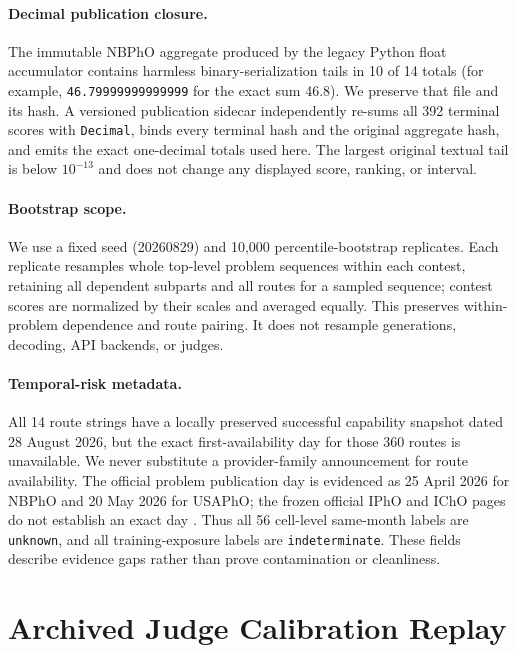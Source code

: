 \documentclass[11pt]{article}
\begin{document}
\paragraph{Decimal publication closure.}
The immutable NBPhO aggregate produced by the legacy Python float accumulator contains harmless binary-serialization tails in 10 of 14 totals (for example, \texttt{46.79999999999999} for the exact sum 46.8). We preserve that file and its hash. A versioned publication sidecar independently re-sums all 392 terminal scores with \texttt{Decimal}, binds every terminal hash and the original aggregate hash, and emits the exact one-decimal totals used here. The largest original textual tail is below $10^{-13}$ and does not change any displayed score, ranking, or interval.

\paragraph{Bootstrap scope.}
We use a fixed seed (20260829) and 10,000 percentile-bootstrap replicates. Each replicate resamples whole top-level problem sequences within each contest, retaining all dependent subparts and all routes for a sampled sequence; contest scores are normalized by their scales and averaged equally. This preserves within-problem dependence and route pairing. It does not resample generations, decoding, API backends, or judges.

\paragraph{Temporal-risk metadata.}
All 14 route strings have a locally preserved successful capability snapshot dated 28 August 2026, but the exact first-availability day for those 360 routes is unavailable. We never substitute a provider-family announcement for route availability. The official problem publication day is evidenced as 25 April 2026 for NBPhO and 20 May 2026 for USAPhO; the frozen official IPhO and IChO pages do not establish an exact day \citep{ipho2026_official_questions,icho2026_official_problems,nbpho2026_media_metadata,usapho2026_official_news}. Thus all 56 cell-level same-month labels are \texttt{unknown}, and all training-exposure labels are \texttt{indeterminate}. These fields describe evidence gaps rather than prove contamination or cleanliness.

\section{Archived Judge Calibration Replay}
\label{app:calibration-replay}
\end{document}
